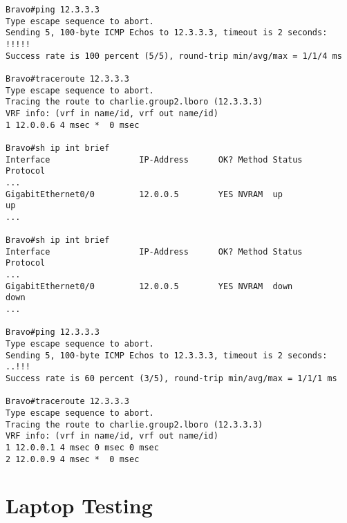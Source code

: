 \begin{lstlisting}[caption={Testing of IS-IS reaction to link failure}, label={listing:isis-testing}]
Bravo#ping 12.3.3.3
Type escape sequence to abort.
Sending 5, 100-byte ICMP Echos to 12.3.3.3, timeout is 2 seconds:
!!!!!
Success rate is 100 percent (5/5), round-trip min/avg/max = 1/1/4 ms

Bravo#traceroute 12.3.3.3
Type escape sequence to abort.
Tracing the route to charlie.group2.lboro (12.3.3.3)
VRF info: (vrf in name/id, vrf out name/id)
1 12.0.0.6 4 msec *  0 msec

Bravo#sh ip int brief
Interface                  IP-Address      OK? Method Status                Protocol
...
GigabitEthernet0/0         12.0.0.5        YES NVRAM  up                    up
...

Bravo#sh ip int brief
Interface                  IP-Address      OK? Method Status                Protocol
...
GigabitEthernet0/0         12.0.0.5        YES NVRAM  down                  down
...

Bravo#ping 12.3.3.3
Type escape sequence to abort.
Sending 5, 100-byte ICMP Echos to 12.3.3.3, timeout is 2 seconds:
..!!!
Success rate is 60 percent (3/5), round-trip min/avg/max = 1/1/1 ms

Bravo#traceroute 12.3.3.3
Type escape sequence to abort.
Tracing the route to charlie.group2.lboro (12.3.3.3)
VRF info: (vrf in name/id, vrf out name/id)
1 12.0.0.1 4 msec 0 msec 0 msec
2 12.0.0.9 4 msec *  0 msec
\end{lstlisting}

\section{Laptop Testing}